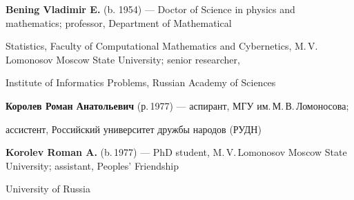 \textbf{Bening Vladimir E.} (b. 1954) --- Doctor of Science in physics and mathematics; professor, Department of Mathematical


Statistics, Faculty of Computational Mathematics and Cybernetics, M.\,V.\,Lomonosov Moscow State University; senior researcher,


Institute of Informatics Problems, Russian Academy of Sciences





\textbf{Королев Роман Анатольевич} (р.\,1977) --- аспирант, МГУ им.\,М.\,В.\,Ломоносова;


ассистент, Российский университет дружбы народов (РУДН)





\textbf{Korolev Roman A.} (b.\,1977) --- PhD student, M.\,V.\,Lomonosov Moscow State University; assistant, Peoples' Friendship


University of Russia








